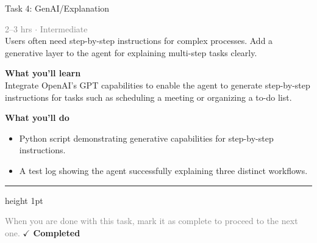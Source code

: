 \documentclass[10pt,a4paper]{article}
\begin{document}
\begin{taskbox}{Task 4: GenAI/Explanation}

    {\small \textcolor{gray}{2--3 hrs $\cdot$ Intermediate}}\\[12pt]

      
Users often need step-by-step instructions for complex processes. Add a generative layer to the agent for explaining multi-step tasks clearly.


\vspace{8pt}
{\large \textbf{\textcolor{brandLight}{What you'll learn}}}\\[4pt]  
Integrate OpenAI's GPT capabilities to enable the agent to generate step-by-step instructions for tasks such as scheduling a meeting or organizing a to-do list.

\vspace{8pt}
{\large \textbf{\textcolor{brandLight}{What you'll do}}}\\[4pt]  
\begin{itemize}
    \item Python script demonstrating generative capabilities for step-by-step instructions.  
    \item A test log showing the agent successfully explaining three distinct workflows.\par
\end{itemize}

    \vspace{16pt}

    \textcolor{cardBorder}{\hrule height 1pt}\vspace{8pt}

    \small \textcolor{gray}{When you are done with this task, mark it as complete to proceed to the next one.} \hfill \textbf{\textcolor{brandDark}{$\checkmark$ Completed}}

\end{taskbox}
\end{document}
